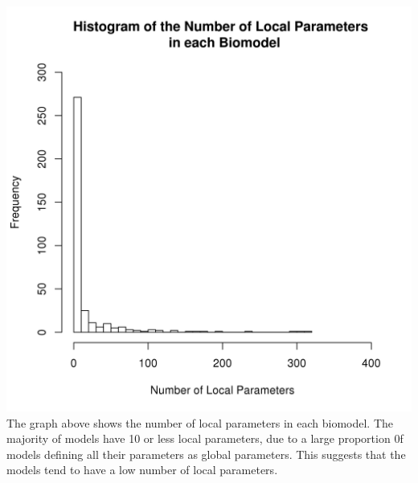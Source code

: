 \documentclass[portrait,a0paper,fontscale=0.35]{baposter}
\begin{document}
\begin{poster}
{\begin{multicols}{2}
 
 \includegraphics[trim= 1.5mm 5mm 5mm 5mm, clip, scale=0.4]{Poster-images/LocalParametersHistogram.png} 
 The graph above shows the number of local parameters in each biomodel. The majority of models have 10 or less local parameters, due to a large proportion 0f models defining all their parameters as global parameters. This suggests that the models tend to have a low number of local parameters.
 \end{multicols}
 }
 
\end{poster}
\end{document}
